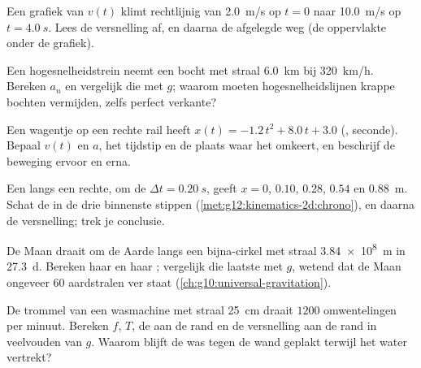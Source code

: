 \begin{exercise}[$\star$]\label{exo:g12:kinematics-2d:5}
Een grafiek van $v(t)$ klimt rechtlijnig van \qty{2.0}{m/s} op $t = 0$
naar \qty{10.0}{m/s} op $t = \qty{4.0}{s}$. Lees de versnelling af, en
daarna de afgelegde weg (de oppervlakte onder de grafiek).
\end{exercise}

\begin{exercise}[$\star\star$]\label{exo:g12:kinematics-2d:6}
Een hogesnelheidstrein neemt een bocht met straal \qty{6.0}{km} bij
\qty{320}{km/h}. Bereken $a_n$ en vergelijk die met $g$; waarom moeten
hogesnelheidslijnen krappe bochten vermijden, zelfs perfect verkante?
\end{exercise}

\begin{exercise}[$\star\star$]\label{exo:g12:kinematics-2d:7}
Een wagentje op een rechte rail heeft $x(t) = -1.2\,t^2 + 8.0\,t + 3.0$
(, seconde). Bepaal $v(t)$ en $a$, het tijdstip en de plaats waar het
omkeert, en beschrijf de beweging ervoor en erna.
\end{exercise}

\begin{exercise}[$\star\star$]\label{exo:g12:kinematics-2d:8}
Een  langs een rechte, om de $\Delta t = \qty{0.20}{s}$,
geeft $x = 0$, $0.10$, $0.28$, $0.54$ en \qty{0.88}{m}. Schat de 
in de drie binnenste stippen
(\cref{met:g12:kinematics-2d:chrono}), en daarna de versnelling; trek je
conclusie.
\end{exercise}

\begin{exercise}[$\star\star$]\label{exo:g12:kinematics-2d:9}
De Maan draait om de Aarde langs een bijna-cirkel met straal
\qty{3.84e8}{m} in \qty{27.3}{d}. Bereken haar  en haar
; vergelijk die laatste met $g$, wetend dat
de Maan ongeveer $60$ aardstralen ver staat
(\cref{ch:g10:universal-gravitation}).
\end{exercise}

\begin{exercise}[$\star\star$]\label{exo:g12:kinematics-2d:10}
De trommel van een wasmachine met straal \qty{25}{cm} draait $1200$
omwentelingen per minuut. Bereken $f$, $T$, de  aan de rand en de
versnelling aan de rand in veelvouden van $g$. Waarom blijft de was
tegen de wand geplakt terwijl het water vertrekt?
\end{exercise}

